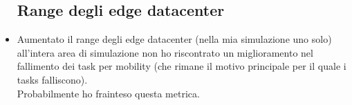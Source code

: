 \documentclass[12pt, a4paper]{report} %
\begin{document}
\begin{itemize}
	\subsection*{Range degli edge datacenter}
		\item Aumentato il range degli edge datacenter (nella mia simulazione uno solo) all'intera area di simulazione non ho riscontrato un miglioramento nel fallimento dei task per mobility (che rimane il motivo principale per il quale i tasks falliscono).\\
		Probabilmente ho frainteso questa metrica.
	\end{itemize}
\end{document}
